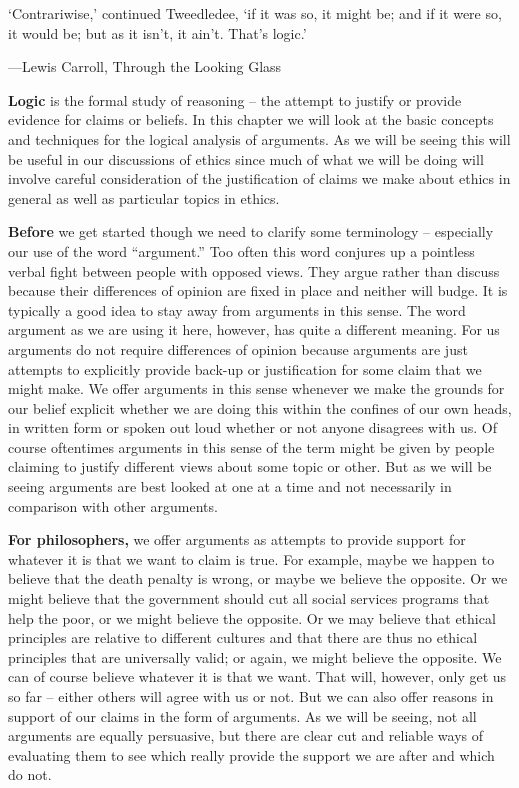 \documentclass[]{book}
\newenvironment{epigraph}%
{
\begin{flushright}
\begin{minipage}{20em}
\begin{flushright}
\itshape
}%
{
\end{flushright}
\end{minipage}
\end{flushright}
\vspace{1em}
}
\begin{document}
\begin{epigraph}
`Contrariwise,' continued Tweedledee, `if it was so, it might be; and if
it were so, it would be; but as it isn't, it ain't. That's logic.'

---Lewis Carroll, Through the Looking Glass
\end{epigraph}

\textbf{Logic} is the formal study of reasoning -- the attempt to justify or provide evidence for claims or beliefs. In this chapter we will look at the basic concepts and techniques for the logical analysis of arguments. As we will be seeing this will be useful in our discussions of ethics since much of what we will be doing will involve careful consideration of the justification of claims we make about ethics in general as well as particular topics in ethics.

\textbf{Before} we get started though we need to clarify some terminology -- especially our use of the word ``argument.'' Too often this word conjures up a pointless verbal fight between people with opposed views. They argue rather than discuss because their differences of opinion are fixed in place and neither will budge. It is typically a good idea to stay away from arguments in this sense. The word argument as we are using it here, however, has quite a different meaning. For us arguments do not require differences of opinion because arguments are just attempts to explicitly provide back-up or justification for some claim that we might make. We offer arguments in this sense whenever we make the grounds for our belief explicit whether we are doing this within the confines of our own heads, in written form or spoken out loud whether or not anyone disagrees with us. Of course oftentimes arguments in this sense of the term might be given by people claiming to justify different views about some topic or other. But as we will be seeing arguments are best looked at one at a time and not necessarily in comparison with other arguments.

\textbf{For philosophers,} we offer arguments as attempts to provide support for whatever it is that we want to claim is true. For example, maybe we happen to believe that the death penalty is wrong, or maybe we believe the opposite. Or we might believe that the government should cut all social services programs that help the poor, or we might believe the opposite. Or we may believe that ethical principles are relative to different cultures and that there are thus no ethical principles that are universally valid; or again, we might believe the opposite. We can of course believe whatever it is that we want. That will, however, only get us so far -- either others will agree with us or not. But we can also offer reasons in support of our claims in the form of arguments. As we will be seeing, not all arguments are equally persuasive, but there are clear cut and reliable ways of evaluating them to see which really provide the support we are after and which do not.
\end{document}
